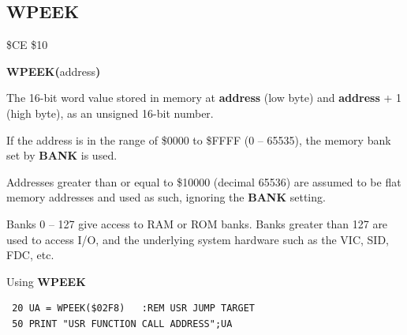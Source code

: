 \subsection{WPEEK}
\begin{description}[leftmargin=2cm,style=nextline]
\item [Token:] \$CE \$10
\item [Format:] {\bf WPEEK(}address{\bf)}
\item [Returns:]  The 16-bit word value stored in memory at {\bf address} (low byte) and
                {\bf address} + 1 (high byte), as an unsigned 16-bit number.

                If the address is in the range of \$0000 to \$FFFF (0 -- 65535), the
                memory bank set by {\bf BANK} is used.

                Addresses greater than or equal to \$10000 (decimal 65536) are assumed to be flat memory
                addresses and used as such, ignoring the {\bf BANK} setting.

\item [Remarks:] Banks 0 -- 127 give access to RAM or ROM banks.
                 Banks greater than 127 are used to access I/O,
                  and the underlying system hardware such as the
                 VIC, SID, FDC, etc.
\item [Example:] Using {\bf WPEEK}

\begin{tcolorbox}[colback=black,coltext=white]
\verbatimfont{\codefont}
\begin{verbatim}
 20 UA = WPEEK($02F8)   :REM USR JUMP TARGET
 50 PRINT "USR FUNCTION CALL ADDRESS";UA
\end{verbatim}
\end{tcolorbox}
\end{description}


\newpage
